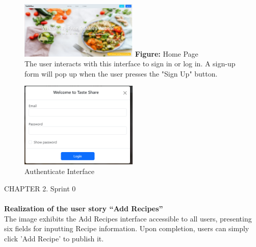 \documentclass{article}
\begin{document}
{{{\begin{figure}[htbp]
    \centering
    \includegraphics[width=0.5\textwidth]{wlcm} 
    \vspace{0.5cm}
    \textbf{Figure:} Home Page \\
    The user interacts with this interface to sign in or log in. A sign-up form will pop up when the user presses the "Sign Up" button.
\end{figure}

\begin{figure}[htbp]
    \centering
    \includegraphics[width=0.5\textwidth]{logtaste}
    \caption{Authenticate Interface}
    \label{fig:design2}
\end{figure}
\newpage
\noindent
CHAPTER 2.  Sprint 0 \\
\underline{\hspace{\textwidth}} \vspace{0.2cm}\\

\textbf{Realization of the user story “Add Recipes”}\\
The image exhibits the Add Recipes interface accessible to all users, presenting six fields for inputting Recipe information. Upon completion, users can simply click 'Add Recipe' to publish it.\\

}}}
\end{document}
